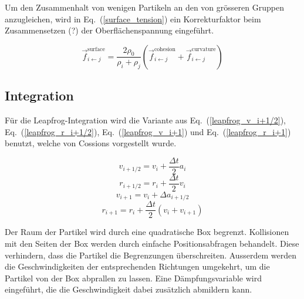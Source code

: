 \documentclass[a4paper]{paper}
\renewcommand{\eqref}[1]{Eq.~(\ref{#1})}
\begin{document}
Um den Zusammenhalt von wenigen Partikeln an den von grösseren Gruppen anzugleichen, wird in \eqref{surface_tension} ein Korrekturfaktor beim Zusammensetzen (?) der Oberflächenspannung eingeführt.

\begin{equation}
	\label{surface_tension}
	\vec{f}_{i\leftarrow j}^{\text{surface}} = \frac{2\rho_{0}}{\rho_{i}+\rho_{j}} (\vec{f}_{i\leftarrow j}^{\text{cohesion}} + \vec{f}_{i\leftarrow j}^{\text{curvature}})
\end{equation}


\subsection{Integration}


Für die Leapfrog-Integration wird die Variante aus \eqref{leapfrog_v_i+1/2}, \eqref{leapfrog_r_i+1/2}, \eqref{leapfrog_v_i+1} und \eqref{leapfrog_r_i+1} benutzt, welche von Cossions vorgestellt wurde. \citep{Leapfrog}

\begin{equation}
\label{leapfrog_v_i+1/2}
v_{i+1/2} = v_{i}+\frac{\Delta t}{2}a_{i}
\end{equation}
\begin{equation}
\label{leapfrog_r_i+1/2}
r_{i+1/2} = r_{i}+\frac{\Delta t}{2}v_{i}
\end{equation}
\begin{equation}
\label{leapfrog_v_i+1}
v_{i+1} = v_{i} + \Delta a_{i+1/2}
\end{equation}
\begin{equation}
\label{leapfrog_r_i+1}
r_{i+1} = r_{i} + \frac{\Delta t}{2} (v_{i} + v_{i+1})
\end{equation}

Der Raum der Partikel wird durch eine quadratische Box begrenzt. Kollisionen mit den Seiten der Box werden durch einfache Positionsabfragen behandelt. Diese verhindern, dass die Partikel die Begrenzungen überschreiten. Ausserdem werden die Geschwindigkeiten der entsprechenden Richtungen umgekehrt, um die Partikel von der Box abprallen zu lassen. Eine Dämpfungsvariable wird eingeführt, die die Geschwindigkeit dabei zusätzlich abmildern kann.
\end{document}

